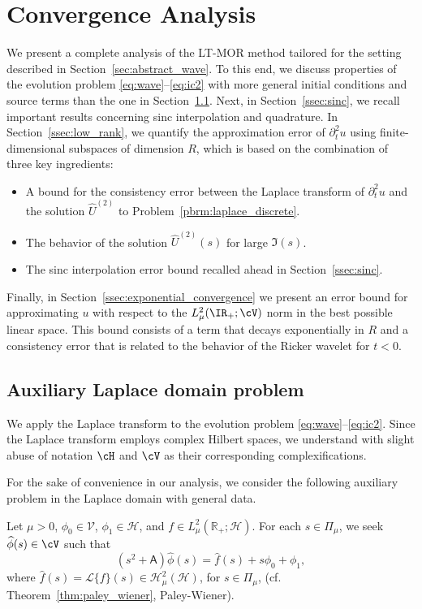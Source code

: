 \section{Convergence Analysis}
\label{sec:convergence_analysis}
We present a complete analysis of the LT-MOR method tailored for 
the setting described in Section~\ref{sec:abstract_wave}.
%
To this end, we discuss properties of the evolution problem \eqref{eq:wave}--\eqref{eq:ic2} with more general initial conditions and source terms than the one in Section~\ref{ssec:auxiliary_L_probl}.
Next, in Section~\ref{ssec:sinc}, we recall important results concerning sinc interpolation
and quadrature.
In Section~\ref{ssec:low_rank}, we quantify the approximation error of $\partial_t^2u$
using finite-dimensional subspaces of dimension $R$, which is based on the combination of three key ingredients: 
\begin{itemize}
    \item[(i)]
    A bound for the consistency error between the Laplace transform of $\partial_t^2 u$ and the solution $\widehat{U}^{(2)}$ to Problem~\ref{pbrm:laplace_discrete}.
    \item[(ii)]
    The behavior of the solution $\widehat{U}^{(2)}(s)$ for large $\Im(s)$.
    \item[(iii)]
    The sinc interpolation error bound recalled ahead in Section~\ref{ssec:sinc}.
\end{itemize}
Finally, in Section~\ref{ssec:exponential_convergence} we present an error bound for approximating $u$ with respect to the $L^2_\mu(\IR_+;\cV)$ norm in the best possible linear space. This bound consists of a term that decays exponentially in $R$ and a consistency error that is related to the behavior of the Ricker wavelet for $t<0$.

\subsection{Auxiliary Laplace domain problem}\label{ssec:auxiliary_L_probl}
We apply the Laplace transform to the evolution problem \eqref{eq:wave}--\eqref{eq:ic2}.
Since the Laplace transform employs complex Hilbert spaces, we understand with slight abuse of notation $\cH$ and $\cV$ as their corresponding complexifications.

For the sake of convenience in our analysis, we consider the following auxiliary problem in the 
Laplace domain with general data.

\begin{problem}\label{pbrm:laplace}
Let $\mu>0$, $\phi_0 \in \mathcal{V}$, $\phi_1 \in \mathcal{H}$, and
$f \in L^2_\mu(\mathbb{R}_+;\mathcal{H})$.
For each $s \in \Pi_\mu$, we seek $\widehat{\phi}(s) \in \cV$ such that
\begin{equation}\label{eq:laplace_weak}
	(s^2 + \mathsf{A})\widehat{\phi}(s)
	=
    \widehat{f}(s) + s \phi_0 + \phi_1,
\end{equation}
where $\widehat{f}(s) = \mathcal{L}\{f\}(s) \in \mathscr{H}^2_\mu(\mathcal{H})$,
for $s \in \Pi_\mu$, (cf. Theorem~\ref{thm:paley_wiener}, Paley-Wiener).
\end{problem}

